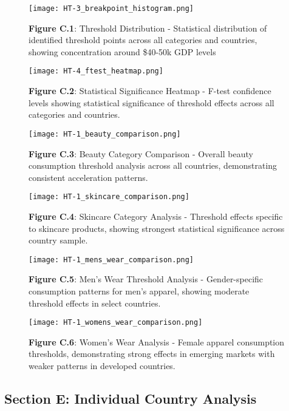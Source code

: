 \documentclass[11pt]{article}
\begin{document}
\begin{figure}[H]
\centering
\texttt{[image: HT-3\_breakpoint\_histogram.png]}
\caption{\textbf{Figure C.1}: Threshold Distribution - Statistical distribution of identified threshold points across all categories and countries, showing concentration around \$40-50k GDP levels}
\end{figure}

\begin{figure}[H]
\centering
\texttt{[image: HT-4\_ftest\_heatmap.png]}
\caption{\textbf{Figure C.2}: Statistical Significance Heatmap - F-test confidence levels showing statistical significance of threshold effects across all categories and countries.}
\end{figure}

\begin{figure}[H]
\centering
\texttt{[image: HT-1\_beauty\_comparison.png]}
\caption{\textbf{Figure C.3}: Beauty Category Comparison - Overall beauty consumption threshold analysis across all countries, demonstrating consistent acceleration patterns.}
\end{figure}

\begin{figure}[H]
\centering
\texttt{[image: HT-1\_skincare\_comparison.png]}
\caption{\textbf{Figure C.4}: Skincare Category Analysis - Threshold effects specific to skincare products, showing strongest statistical significance across country sample.}
\end{figure}

\begin{figure}[H]
\centering
\texttt{[image: HT-1\_mens\_wear\_comparison.png]}
\caption{\textbf{Figure C.5}: Men's Wear Threshold Analysis - Gender-specific consumption patterns for men's apparel, showing moderate threshold effects in select countries.}
\end{figure}

\begin{figure}[H]
\centering
\texttt{[image: HT-1\_womens\_wear\_comparison.png]}
\caption{\textbf{Figure C.6}: Women's Wear Analysis - Female apparel consumption thresholds, demonstrating strong effects in emerging markets with weaker patterns in developed countries.}
\end{figure}


\subsection*{Section E: Individual Country Analysis}
\end{document}
